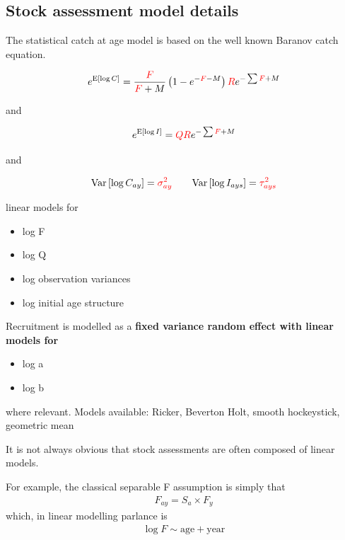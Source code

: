 \documentclass[a4paper,english,10pt]{article}\usepackage[]{graphicx}\usepackage[]{color}
\newcommand{\E}[1]{\text{E}\left[#1\right]}
\newcommand{\Var}[1]{\text{Var}\left[#1\right]}
\begin{document}
\subsection{Stock assessment model details}

The statistical catch at age model is based on the well known Baranov catch equation. 

\begin{equation*}
e^{\E{\log C}} = \frac{\color{red}F}{{\color{red}F}+M}\left(1 - e^{-{\color{red}F}-M}\right) {\color{red}R}e^{-\sum {\color{red}F} + M}
\end{equation*}

and

\begin{equation*}
e^{\E{\log I}} = {\color{red}Q} {\color{red}R}e^{-\sum {\color{red}F} + M}
\end{equation*}

and

\begin{equation*}
\Var{\log C_{ay}} = {\color{red}\sigma^2_{ay}} \qquad \Var{\log I_{ays}} = {\color{red}\tau^2_{ays}}
\end{equation*}

linear models for
\begin{itemize}
  \item log F
  \item log Q
  \item log observation variances
  \item log initial age structure  
\end{itemize}

Recruitment is modelled as a \bf{fixed variance} random effect with linear models for
\begin{itemize}
  \item log a
  \item log b
\end{itemize}
where relevant.  Models available: Ricker, Beverton Holt, smooth hockeystick, geometric mean

It is not always obvious that stock assessments are often composed of linear models.

For example, the classical separable F assumption is simply that
\begin{align*}
F_{ay} = S_a \times F_y 
\end{align*}
which, in linear modelling parlance is
\begin{align*}
\log F \sim \text{age} + \text{year} 
\end{align*}
\end{document}
